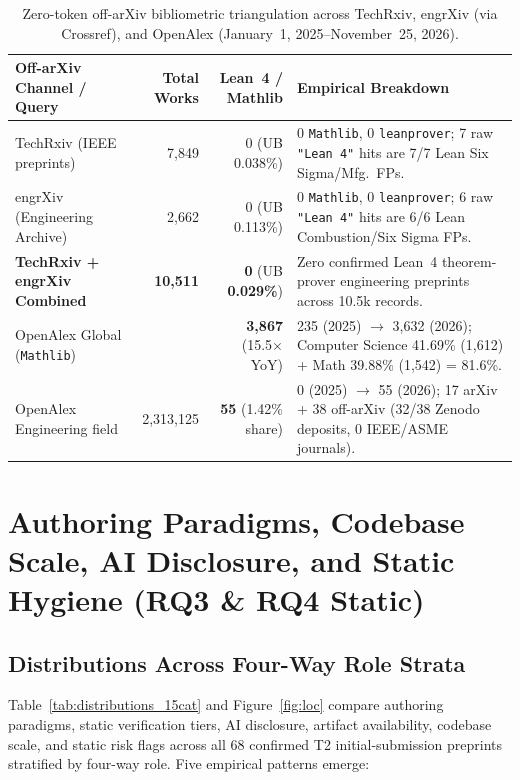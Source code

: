 \documentclass[11pt,letterpaper]{article}
\begin{document}
\begin{table}[t]
\centering
\caption{Zero-token off-arXiv bibliometric triangulation across TechRxiv, engrXiv (via Crossref), and OpenAlex (January~1, 2025--November~25, 2026).}
\label{tab:off_arxiv}
\scriptsize
\setlength{\tabcolsep}{3.0pt}
\begin{tabularx}{\textwidth}{lrrX}
\toprule
\textbf{Off-arXiv Channel / Query} & \textbf{Total Works} & \textbf{Lean~4 / Mathlib} & \textbf{Empirical Breakdown} \\
\midrule
TechRxiv (IEEE preprints) & 7,849 & 0 (UB 0.038\%) & 0 \texttt{Mathlib}, 0 \texttt{leanprover}; 7 raw \texttt{"Lean 4"} hits are 7/7 Lean Six Sigma/Mfg.\ FPs. \\
engrXiv (Engineering Archive) & 2,662 & 0 (UB 0.113\%) & 0 \texttt{Mathlib}, 0 \texttt{leanprover}; 6 raw \texttt{"Lean 4"} hits are 6/6 Lean Combustion/Six Sigma FPs. \\
\textbf{TechRxiv + engrXiv Combined} & \textbf{10,511} & \textbf{0} (UB \textbf{0.029\%}) & Zero confirmed Lean~4 theorem-prover engineering preprints across 10.5k records. \\
\midrule
OpenAlex Global (\texttt{Mathlib}) & \textemdash{} & \textbf{3,867} (15.5$\times$ YoY) & 235 (2025) $\to$ 3,632 (2026); Computer Science 41.69\% (1,612) + Math 39.88\% (1,542) = 81.6\%. \\
OpenAlex Engineering field & 2,313,125 & \textbf{55} (1.42\% share) & 0 (2025) $\to$ 55 (2026); 17 arXiv + 38 off-arXiv (32/38 Zenodo deposits, 0 IEEE/ASME journals). \\
\bottomrule
\end{tabularx}
\end{table}

\section{Authoring Paradigms, Codebase Scale, AI Disclosure, and Static Hygiene (RQ3 \& RQ4 Static)}
\label{sec:paradigms_and_scale}

\subsection{Distributions Across Four-Way Role Strata}
\label{sec:distributions}

Table~\ref{tab:distributions_15cat} and Figure~\ref{fig:loc} compare authoring paradigms, static verification tiers, AI disclosure, artifact availability, codebase scale, and static risk flags across all 68 confirmed T2 initial-submission preprints stratified by four-way role. Five empirical patterns emerge:
\end{document}
